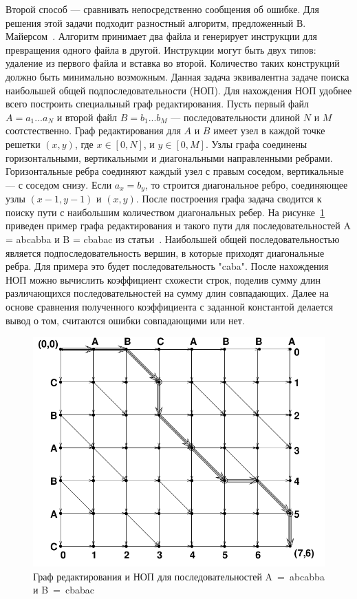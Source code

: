 Второй способ --- сравнивать непосредственно сообщения об ошибке. Для решения этой задачи подходит разностный алгоритм, предложенный В. Майерсом~\cite{myers1986ano}. Алгоритм принимает два файла и генерирует инструкции для превращения одного файла в другой. Инструкции могут быть двух типов: удаление из первого файла и вставка во второй. Количество таких конструкций должно быть минимально возможным. Данная задача эквивалентна задаче поиска наибольшей общей подпоследовательности (НОП). Для нахождения НОП удобнее всего построить специальный граф редактирования. Пусть первый файл $A = a_1...a_N$ и второй файл $B = b_1...b_M$ --- последовательности длиной $N$ и $M$ соотстественно. Граф редактирования для $A$ и $B$ имеет узел в каждой точке решетки $(x, y)$, где $x \in [0, N]$, и $y \in [0, M]$. Узлы графа соединены горизонтальными, вертикальными и диагональными направленными ребрами. Горизонтальные ребра соединяют каждый узел с правым соседом, вертикальные --- с соседом снизу. Если $a_x = b_y$, то строится диагональное ребро, соединяющее узлы $(x-1, y-1)$ и $(x, y)$. После построения графа задача сводится к поиску пути с наибольшим количеством диагональных ребер.
На рисунке~\ref{ex:lcs} приведен пример графа редактирования и такого пути для последовательностей A = abcabba и B = cbabac из статьи~\cite{myers1986ano}. Наибольшей общей последовательностью является подпоследовательность вершин, в которые приходят диагональные ребра. Для примера это будет последовательность "caba". После нахождения НОП можно вычислить коэффициент схожести строк, поделив сумму длин различающихся последовательностей на сумму длин совпадающих. Далее на основе сравнения полученного коэффициента с заданной константой делается вывод о том, считаются ошибки совпадающими или нет.

\begin{figure}	
		\includegraphics[width=0.99\linewidth]{fig/lcsexample} 
		\caption{\label{ex:lcs}Граф редактирования и НОП для последовательностей A~=~abcabba и B~=~cbabac}
\end{figure}

